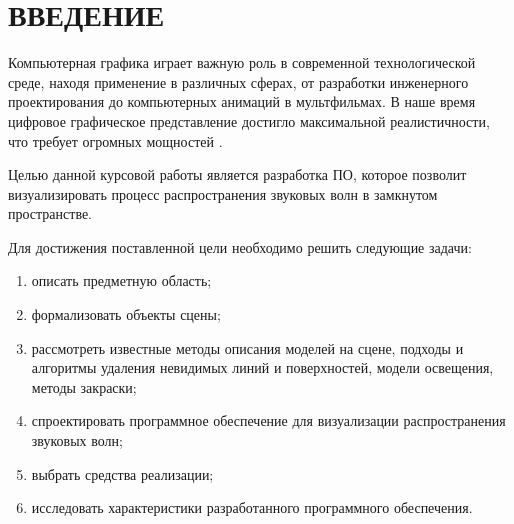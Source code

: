 \chapter*{ВВЕДЕНИЕ}

Компьютерная графика играет важную роль в современной технологической среде, находя применение в различных сферах, от разработки инженерного проектирования до компьютерных анимаций в мультфильмах.
В наше время цифровое графическое представление достигло максимальной реалистичности, что требует огромных мощностей \cite{usage}.

Целью данной курсовой работы является разработка ПО, которое позволит визуализировать процесс распространения звуковых волн в замкнутом пространстве.

Для достижения поставленной цели необходимо решить следующие задачи:
\begin{enumerate}
	\item описать предметную область;
	\item формализовать объекты сцены;
	\item рассмотреть известные методы описания моделей на сцене, подходы и алгоритмы удаления невидимых линий и поверхностей, модели освещения, методы закраски;
	\item спроектировать программное обеспечение для визуализации распространения звуковых волн;
	\item выбрать средства реализации;
	\item исследовать характеристики разработанного программного обеспечения.
\end{enumerate}